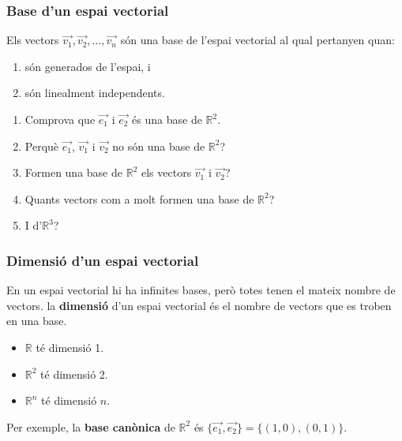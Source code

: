 \documentclass{beamer}
\begin{document}
\begin{frame}
  \frametitle{Base d'un espai vectorial}

    Els vectors $\overrightarrow{v_1},\overrightarrow{v_2}, \ldots, \overrightarrow{v_n}$ són una base de l'espai vectorial al qual pertanyen quan:
    \begin{enumerate}
      \item són generados de l'espai, i
      \item són linealment independents.
    \end{enumerate}

  \begin{exercise}{}
    \begin{enumerate}
      \item Comprova que $\overrightarrow{e_1}$ i $\overrightarrow{e_2}$ és una base de $\mathbb{R}^2$.
      \item Perquè $\overrightarrow{e_1}$, $\overrightarrow{v_1}$ i $\overrightarrow{v_2}$ no són una base de $\mathbb{R}^2$?
      \item Formen una base de $\mathbb{R}^2$ els vectors $\overrightarrow{v_1}$ i $\overrightarrow{v_2}$?
      \item Quants vectors com a molt formen una base de $\mathbb{R}^2$?
      \item I d'$\mathbb{R}^3$?
    \end{enumerate}
  \end{exercise}
\end{frame}
\begin{frame}
  \frametitle{Dimensió d'un espai vectorial}

    En un espai vectorial hi ha infinites bases, però totes tenen el mateix nombre de vectors. la {\bf dimensió} d'un espai vectorial és el nombre de vectors que es troben en una base.

    \begin{itemize}
      \item $\mathbb{R}$ té dimensió 1.
      \item $\mathbb{R}^2$ té dimensió 2.
      \item $\mathbb{R}^n$ té dimensió $n$.
    \end{itemize}

    Per exemple, la {\bf base canònica} de $\mathbb{R}^2$ és $\{\overrightarrow{e_1},\overrightarrow{e_2}\}=\{(1,0),(0,1)\}$.

\end{frame}
\end{document}

